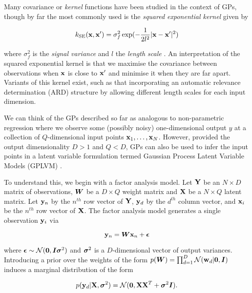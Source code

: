 Many covariance or \emph{kernel} functions have been studied in the context of GPs, though by far the most commonly used is the \emph{squared exponential kernel} given by

 \begin{equation}
 	k_{\text{SE}}({\bf x}, {\bf x}') = \sigma_f^2 \exp(-\frac{1}{2l^2}|{\bf x} - {\bf x}'|^2)
 \end{equation}

 where $\sigma_f^2$ is the \emph{signal variance} and $l$ the \emph{length scale} \cite{rasmussen2006gaussian}. An interpretation of the squared exponential kernel is that we maximise the covariance between observations when ${\bf x}$ is close to ${\bf x}'$ and minimise it when they are far apart. Variants of this kernel exist, such as that incorporating an automatic relevance determination (ARD) structure by allowing different length scales for each input dimension.

 We can think of the GPs described so far as analogous to non-parametric regression where we observe some (possibly noisy) one-dimensional output $y$ at a collection of $Q$-dimensional input points ${\bf x}_1, \ldots, {\bf x}_N$. However, provided the output dimensionality $D > 1$ and $Q < D$, GPs can also be used to infer the input points in a latent variable formulation termed Gaussian Process Latent Variable Models (GPLVM) \cite{Lawrence2005-cu}.

 To understand this, we begin with a factor analysis model. Let ${\bf Y}$ be an $N \times D$ matrix of observations, ${\bm W}$ be a $D \times Q$ weight matrix and ${\bf X}$ be a $N \times Q$ latent matrix. Let ${\bf y}_n$ by the $n^{th}$ row vector of ${\bf Y}$, ${\bf y}_d$ by the $d^{th}$ column vector, and ${\bf x}_i$ be the $n^{th}$ row vector of ${\bf X}$. The factor analysis model generates a single observation ${\bf y}_i$ via

 \begin{equation}
 	{\bf y}_n = {\bm W} {\bf x}_n + {\bm\epsilon}
 \end{equation}

 where ${\bm \epsilon} \sim \mathcal{N}({\bm 0}, {\bm I} {\bm \sigma}^2)$ and ${\bm \sigma}^2$ is a $D$-dimensional vector of output variances. Introducing a prior over the weights of the form $p({\bm W}) = \prod_{d=1}^D \mathcal{N}({\bf w}_d| {\bm 0}, {\bm I})$ induces a marginal distribution of the form

 \begin{equation}
 	p({\bf y}_d | {\bf X}, {\bm \sigma}^2) = \mathcal{N}({\bm 0}, {\bf X} {\bf X}^T + {\bm \sigma}^2 {\bm I}).
 \end{equation}

